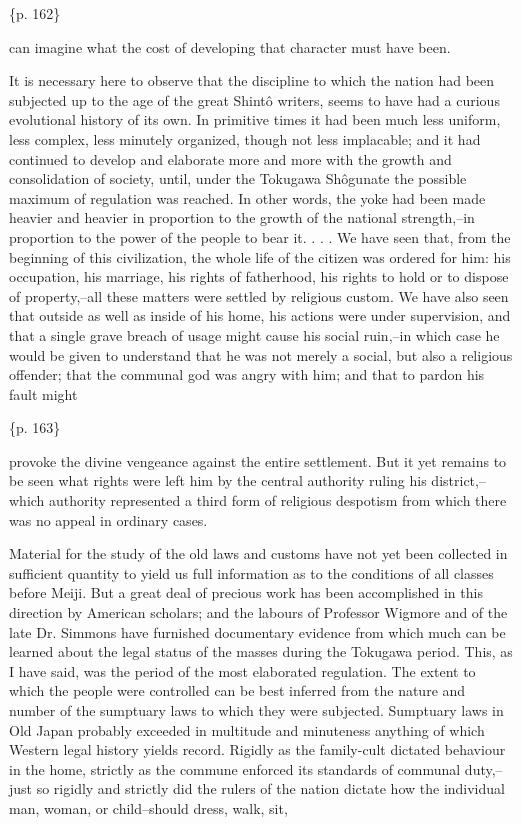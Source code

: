 \{p. 162\}

can imagine what the cost of developing that character must have been.



It is necessary here to observe that the discipline to which the nation had been subjected up to the age of the great Shintô writers, seems to have had a curious evolutional history of its own. In primitive times it had been much less uniform, less complex, less minutely organized, though not less implacable; and it had continued to develop and elaborate more and more with the growth and consolidation of society, until, under the Tokugawa Shôgunate the possible maximum of regulation was reached. In other words, the yoke had been made heavier and heavier in proportion to the growth of the national strength,--in proportion to the power of the people to bear it. . . . We have seen that, from the beginning of this civilization, the whole life of the citizen was ordered for him: his occupation, his marriage, his rights of fatherhood, his rights to hold or to dispose of property,--all these matters were settled by religious custom. We have also seen that outside as well as inside of his home, his actions were under supervision, and that a single grave breach of usage might cause his social ruin,--in which case he would be given to understand that he was not merely a social, but also a religious offender; that the communal god was angry with him; and that to pardon his fault might

\{p. 163\}

provoke the divine vengeance against the entire settlement. But it yet remains to be seen what rights were left him by the central authority ruling his district,--which authority represented a third form of religious despotism from which there was no appeal in ordinary cases.



Material for the study of the old laws and customs have not yet been collected in sufficient quantity to yield us full information as to the conditions of all classes before Meiji. But a great deal of precious work has been accomplished in this direction by American scholars; and the labours of Professor Wigmore and of the late Dr. Simmons have furnished documentary evidence from which much can be learned about the legal status of the masses during the Tokugawa period. This, as I have said, was the period of the most elaborated regulation. The extent to which the people were controlled can be best inferred from the nature and number of the sumptuary laws to which they were subjected. Sumptuary laws in Old Japan probably exceeded in multitude and minuteness anything of which Western legal history yields record. Rigidly as the family-cult dictated behaviour in the home, strictly as the commune enforced its standards of communal duty,--just so rigidly and strictly did the rulers of the nation dictate how the individual man, woman, or child--should dress, walk, sit,

